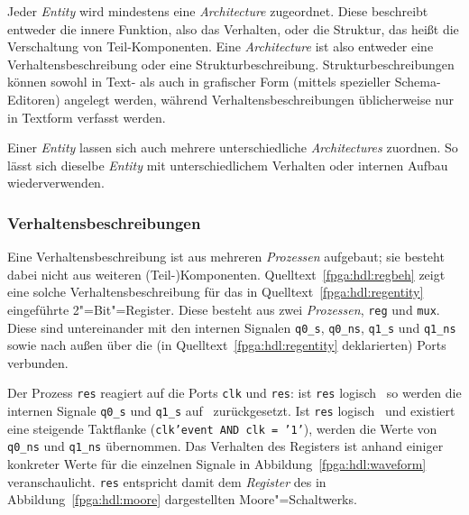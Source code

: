 Jeder \textit{Entity} wird mindestens eine \textit{Architecture} zugeordnet.
Diese beschreibt entweder die innere Funktion, also das Verhalten, oder die
Struktur, das heißt die Verschaltung von Teil-Komponenten. Eine
\textit{Architecture} ist also entweder eine Verhaltensbeschreibung oder eine
Strukturbeschreibung. Strukturbeschreibungen können sowohl in Text- als auch
in grafischer Form (mittels spezieller Schema-Editoren) angelegt werden, während
Verhaltensbeschreibungen üblicherweise nur in Textform verfasst werden.
\cite[vgl.][27]{kesel2013}

Einer \textit{Entity} lassen sich auch mehrere unterschiedliche
\textit{Architectures} zuordnen. So lässt sich dieselbe \textit{Entity} mit
unterschiedlichem Verhalten oder internen Aufbau wiederverwenden.
\cite[vgl.][27]{kesel2013}

\subsubsection{Verhaltensbeschreibungen}

Eine Verhaltensbeschreibung ist aus mehreren \textit{Prozessen} aufgebaut; sie
besteht dabei nicht aus weiteren (Teil-)Komponenten.
Quelltext~\ref{fpga:hdl:regbeh} zeigt eine solche Verhaltensbeschreibung für
das in Quelltext~\ref{fpga:hdl:regentity} eingeführte 2"=Bit"=Register. Diese
besteht aus zwei \textit{Prozessen}, \texttt{reg} und \texttt{mux}. Diese sind
untereinander mit den internen Signalen \texttt{q0\_s}, \texttt{q0\_ns},
\texttt{q1\_s} und \texttt{q1\_ns} sowie nach außen über die (in
Quelltext~\ref{fpga:hdl:regentity} deklarierten) Ports verbunden.
\cite[vgl.][29]{kesel2013}

Der Prozess \texttt{res} reagiert auf die Ports \texttt{clk} und \texttt{res}:
ist \texttt{res} logisch \grqq\, so werden die internen Signale
\texttt{q0\_s} und \texttt{q1\_s} auf \grqq\ zurückgesetzt. Ist
\texttt{res} logisch \grqq\ und existiert eine steigende Taktflanke
(\texttt{clk'event AND clk = '1'}), werden die Werte von \texttt{q0\_ns} und
\texttt{q1\_ns} übernommen. Das Verhalten des Registers ist anhand einiger
konkreter Werte für die einzelnen Signale in Abbildung~\ref{fpga:hdl:waveform}
veranschaulicht. \texttt{res} entspricht damit dem \textit{Register} des in
Abbildung~\ref{fpga:hdl:moore} dargestellten Moore"=Schaltwerks.
\cite[vgl.][30--31]{kesel2013}

